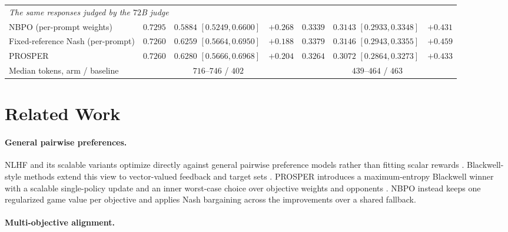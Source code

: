 \documentclass{article}
\theoremstyle{remark}
\theoremstyle{plain}
\newcommand{\NBPO}{\textsc{NBPO}}
\begin{document}
\begin{table}[H]
\begin{tabular}{lcccccc}
\midrule
\multicolumn{7}{l}{\emph{The same responses judged by the $72$B judge}}\\
NBPO (per-prompt weights) & $0.7295$ & $0.5884$ \tiny{$[0.5249,0.6600]$} & $+0.268$ & $0.3339$ & $0.3143$ \tiny{$[0.2933,0.3348]$} & $+0.431$\\
Fixed-reference Nash (per-prompt) & $0.7260$ & $0.6259$ \tiny{$[0.5664,0.6950]$} & $+0.188$ & $0.3379$ & $\mathbf{0.3146}$ \tiny{$[0.2943,0.3355]$} & $+0.459$\\
PROSPER \citep{zhang2026prosper} & $0.7260$ & $\mathbf{0.6280}$ \tiny{$[0.5666,0.6968]$} & $+0.204$ & $0.3264$ & $0.3072$ \tiny{$[0.2864,0.3273]$} & $+0.433$\\
\midrule
Median tokens, arm / baseline & \multicolumn{3}{c}{$716$--$746$ / $402$} & \multicolumn{3}{c}{$439$--$464$ / $463$}\\
\bottomrule
\end{tabular}
\end{table}

\section{Related Work}
\label{sec:related}
\paragraph{General pairwise preferences.}
NLHF and its scalable variants optimize directly against general pairwise preference models rather than fitting scalar rewards \citep{munos2024nash,wu2025sppo,zhang2025iterative,calandriello2024online,rosset2024direct,zhou2025egpo}. Blackwell-style methods extend this view to vector-valued feedback and target sets \citep{blackwell1956analog,bhatia2020multicriteria}. PROSPER introduces a maximum-entropy Blackwell winner with a scalable single-policy update and an inner worst-case choice over objective weights and opponents \citep{zhang2026prosper}. \NBPO{} instead keeps one regularized game value per objective and applies Nash bargaining across the improvements over a shared fallback.

\paragraph{Multi-objective alignment.}
\end{document}
